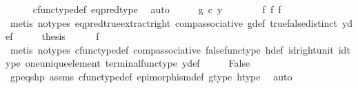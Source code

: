 \begin{isabellebody}
\ \ \ \ \isamarkupfalse%
\ cfunc{\isacharunderscore}{\kern0pt}type{\isacharunderscore}{\kern0pt}def\ eq{\isacharunderscore}{\kern0pt}pred{\isacharunderscore}{\kern0pt}type\ \isamarkupfalse%
\ auto\isanewline
\ \ \isamarkupfalse%
\ \isamarkupfalse%
\ {\isachardoublequoteopen}g\ {\isasymcirc}\isactrlsub c\ y{}\ {\isasymnoteq}\ {\isasymf}{\isachardoublequoteclose}\isanewline
\ \ \ \ \isamarkupfalse%
\ f{}\ f{}\ f{}\ \isamarkupfalse%
\ {\isacharparenleft}{\kern0pt}metis\ {\isacharparenleft}{\kern0pt}no{\isacharunderscore}{\kern0pt}types{\isacharparenright}{\kern0pt}\ eq{\isacharunderscore}{\kern0pt}pred{\isacharunderscore}{\kern0pt}true{\isacharunderscore}{\kern0pt}extract{\isacharunderscore}{\kern0pt}right\ comp{\isacharunderscore}{\kern0pt}associative\ g{\isacharunderscore}{\kern0pt}def\ true{\isacharunderscore}{\kern0pt}false{\isacharunderscore}{\kern0pt}distinct\ y{\isacharunderscore}{\kern0pt}def{\isacharparenright}{\kern0pt}\isanewline
\ \ \isamarkupfalse%
\ \isamarkupfalse%
\ {\isacharquery}{\kern0pt}thesis\isanewline
\ \ \ \ \isamarkupfalse%
\ f{}\ \isamarkupfalse%
\ {\isacharparenleft}{\kern0pt}metis\ {\isacharparenleft}{\kern0pt}no{\isacharunderscore}{\kern0pt}types{\isacharparenright}{\kern0pt}\ cfunc{\isacharunderscore}{\kern0pt}type{\isacharunderscore}{\kern0pt}def\ comp{\isacharunderscore}{\kern0pt}associative\ false{\isacharunderscore}{\kern0pt}func{\isacharunderscore}{\kern0pt}type\ h{\isacharunderscore}{\kern0pt}def\ id{\isacharunderscore}{\kern0pt}right{\isacharunderscore}{\kern0pt}unit{}\ id{\isacharunderscore}{\kern0pt}type\ one{\isacharunderscore}{\kern0pt}unique{\isacharunderscore}{\kern0pt}element\ terminal{\isacharunderscore}{\kern0pt}func{\isacharunderscore}{\kern0pt}type\ y{\isacharunderscore}{\kern0pt}def{\isacharparenright}{\kern0pt}\isanewline
{}\isamarkupfalse%
\isanewline
\ \ \isamarkupfalse%
\ \isamarkupfalse%
\ False\isanewline
\ \ \ \ \isamarkupfalse%
\ gp{\isacharunderscore}{\kern0pt}eqs{\isacharunderscore}{\kern0pt}hp\ assms\ cfunc{\isacharunderscore}{\kern0pt}type{\isacharunderscore}{\kern0pt}def\ epimorphism{\isacharunderscore}{\kern0pt}def\ g{\isacharunderscore}{\kern0pt}type\ h{\isacharunderscore}{\kern0pt}type\ \isamarkupfalse%
\ auto\isanewline
{}\isamarkupfalse%
%
\endisatagproof
{\isafoldproof}%

\end{isabellebody}

